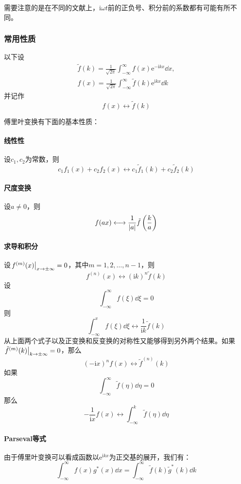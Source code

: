 \documentclass[UTF8]{ctexart}
\newcommand*{\ii}{\mathrm{i}}
\newcommand*{\ee}{\mathrm{e}}
\begin{document}
需要注意的是在不同的文献上，$\ii \omega t$前的正负号、积分前的系数都有可能有所不同。

\subsubsection{常用性质}

以下设
\[
    \begin{split}
        \tilde{f}(k) = \frac{1}{\sqrt{2\pi}} \int_{-\infty}^\infty f(x) \ee^{-\ii k x} \dd x, \\
        f(x) = \frac{1}{\sqrt{2\pi}} \int_{-\infty}^\infty \tilde{f}(k) \ee^{\ii k x} \dd k
    \end{split}
\]
并记作
\[
    f(x) \longleftrightarrow \tilde{f}(k)
\]

傅里叶变换有下面的基本性质：
\paragraph{线性性} 设$c_1, c_2$为常数，则
\[
    c_1 f_1(x) + c_2 f_2(x) \longleftrightarrow c_1 \tilde{f}_1(k) + c_2 \tilde{f}_2(k)
\]

\paragraph{尺度变换} 设$a\neq 0$，则
\[
    f(ax) \longleftrightarrow \frac{1}{\abs{a}} \tilde{f} \left( \frac{k}{a} \right)
\]

\paragraph{求导和积分} 设$\eval{f^{(m)}(x)}_{x\to \pm \infty} = 0$，其中$m=1, 2, \ldots, n-1$，则
\[
    f^{(n)}(x) \longleftrightarrow (\ii k)^n \tilde{f}(k)
\]
设
\[
    \int_{-\infty}^\infty f(\xi) \dd \xi = 0
\]
则
\[
    \int_{-\infty}^x f(\xi) \dd \xi \longleftrightarrow \frac{1}{\ii k} \tilde{f}(k)
\]
从上面两个式子以及正变换和反变换的对称性又能够得到另外两个结果。如果$\eval{\tilde{f}^{(m)}(k)}_{k \to \pm \infty} = 0$，那么
\[
    (-\ii x)^n f(x) \longleftrightarrow \tilde{f}^{(n)}(k)
\]
如果
\[
    \int_{-\infty}^\infty \tilde{f}(\eta) \dd \eta = 0
\]
那么
\[
    - \frac{1}{\ii x} f(x) \longleftrightarrow \int_{-\infty}^k \tilde{f}(\eta) \dd \eta
\]

\paragraph{Parseval等式} 由于傅里叶变换可以看成函数以$\ee^{\ii k x}$为正交基的展开，我们有：
\[
    \int_{-\infty}^\infty f(x) g^*(x) \dd x =  \int_{-\infty}^\infty \tilde{f}(k) \tilde{g}^*(k) \dd k
\]
\end{document}
